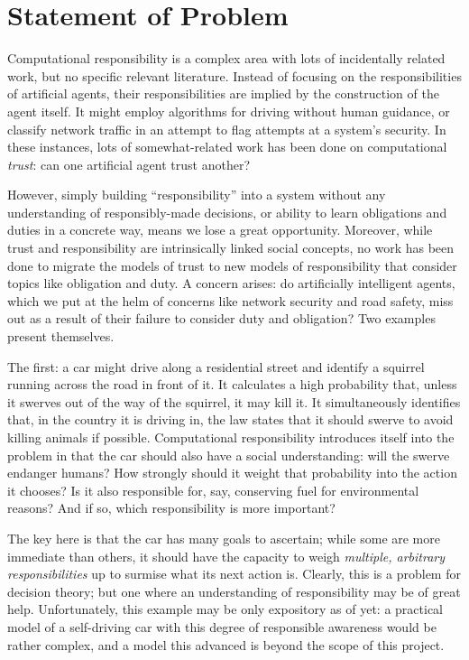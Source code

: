 \section{Statement of Problem}\label{sec:statement_of_problem}

Computational responsibility is a complex area with lots of incidentally related work, but no specific relevant literature. Instead of focusing on the responsibilities of artificial agents, their responsibilities are implied by the construction of the agent itself. It might employ algorithms for driving without human guidance, or classify network traffic in an attempt to flag attempts at a system's security. In these instances, lots of somewhat-related work has been done on computational \emph{trust}: can one artificial agent trust another?\par

However, simply building ``responsibility'' into a system without any understanding of responsibly-made decisions, or ability to learn obligations and duties in a concrete way, means we lose a great opportunity. Moreover, while trust and responsibility are intrinsically linked social concepts, no work has been done to migrate the models of trust to new models of responsibility that consider topics like obligation and duty. A concern arises: do artificially intelligent agents, which we put at the helm of concerns like network security and road safety, miss out as a result of their failure to consider duty and obligation? Two examples present themselves.\par

The first: a car might drive along a residential street and identify a squirrel running across the road in front of it. It calculates a high probability that, unless it swerves out of the way of the squirrel, it may kill it. It simultaneously identifies that, in the country it is driving in, the law states that it should swerve to avoid killing animals if possible. Computational responsibility introduces itself into the problem in that the car should also have a social understanding: will the swerve endanger humans? How strongly should it weight that probability into the action it chooses? Is it also responsible for, say, conserving fuel for environmental reasons? And if so, which responsibility is more important? \par

The key here is that the car has many goals to ascertain; while some are more immediate than others, it should have the capacity to weigh \emph{multiple, arbitrary responsibilities} up to surmise what its next action is. Clearly, this is a problem for decision theory; but one where an understanding of responsibility may be of great help. Unfortunately, this example may be only expository as of yet: a practical model of a self-driving car with this degree of responsible awareness would be rather complex, and a model this advanced is beyond the scope of this project.\par

